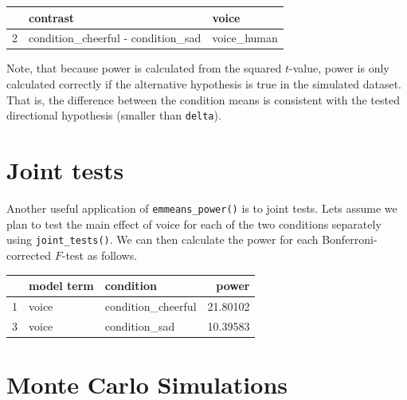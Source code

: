 \documentclass[
]{book}
\newenvironment{Shaded}{\begin{snugshade}}{\end{snugshade}}
\newcommand{\AttributeTok}[1]{\textcolor[rgb]{0.77,0.63,0.00}{#1}}
\newcommand{\DecValTok}[1]{\textcolor[rgb]{0.00,0.00,0.81}{#1}}
\newcommand{\FloatTok}[1]{\textcolor[rgb]{0.00,0.00,0.81}{#1}}
\newcommand{\FunctionTok}[1]{\textcolor[rgb]{0.00,0.00,0.00}{#1}}
\newcommand{\NormalTok}[1]{#1}
\newcommand{\OtherTok}[1]{\textcolor[rgb]{0.56,0.35,0.01}{#1}}
\newcommand{\SpecialCharTok}[1]{\textcolor[rgb]{0.00,0.00,0.00}{#1}}
\newcommand{\StringTok}[1]{\textcolor[rgb]{0.31,0.60,0.02}{#1}}
\begin{document}
\begin{tabular}{l|l|l}
\hline
  & contrast & voice\\
\hline
2 & condition\_cheerful - condition\_sad & voice\_human\\
\hline
\end{tabular}

Note, that because power is calculated from the squared \(t\)-value, power is only calculated correctly if the alternative hypothesis is true in the simulated dataset.
That is, the difference between the condition means is consistent with the tested directional hypothesis (smaller than \texttt{delta}).

\hypertarget{joint-tests}{%
\section{Joint tests}\label{joint-tests}}

Another useful application of \texttt{emmeans\_power()} is to joint tests.
Lets assume we plan to test the main effect of voice for each of the two conditions separately using \texttt{joint\_tests()}.
We can then calculate the power for each Bonferroni-corrected \(F\)-test as follows.

\begin{Shaded}
\end{Shaded}

\begin{tabular}{l|l|l|r}
\hline
  & model term & condition & power\\
\hline
1 & voice & condition\_cheerful & 21.80102\\
\hline
3 & voice & condition\_sad & 10.39583\\
\hline
\end{tabular}

\hypertarget{monte-carlo-simulations}{%
\section{Monte Carlo Simulations}\label{monte-carlo-simulations}}
\end{document}
